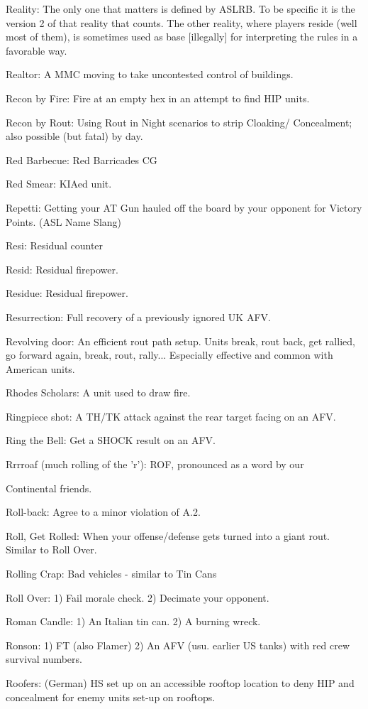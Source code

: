 \documentclass[letterpaper]{article}
\begin{document}
Reality: The only one that matters is defined by ASLRB. To be specific it is the version 2 of that reality that counts. The other reality, where players reside (well most of them), is sometimes used as base [illegally] for interpreting the rules in a favorable way.

Realtor: A MMC moving to take uncontested control of buildings.

Recon by Fire: Fire at an empty hex in an attempt to find HIP units.

Recon by Rout: Using Rout in Night scenarios to strip Cloaking/ Concealment; also possible (but fatal) by day.

Red Barbecue: Red Barricades CG

Red Smear: KIAed unit.

Repetti: Getting your AT Gun hauled off the board by your opponent for Victory Points. (ASL Name Slang)

Resi: Residual counter

Resid: Residual firepower.

Residue: Residual firepower.

Resurrection: Full recovery of a previously ignored UK AFV.

Revolving door: An efficient rout path setup.  Units break, rout back, get rallied, go forward again, break, rout, rally... Especially effective and common with American units.

Rhodes Scholars: A unit used to draw fire.

Ringpiece shot:  A TH/TK attack against the rear target facing on an AFV.

Ring the Bell: Get a SHOCK result on an AFV.

Rrrroaf (much rolling of the 'r'):  ROF, pronounced as a word by our

Continental friends.

Roll-back: Agree to a minor violation of A.2.

Roll, Get Rolled: When your offense/defense gets turned into a giant rout. Similar to Roll Over.

Rolling Crap: Bad vehicles - similar to Tin Cans

Roll Over: 1) Fail morale check. 2) Decimate your opponent.

Roman Candle: 1) An Italian tin can. 2) A burning wreck.

Ronson: 1) FT (also Flamer) 2) An AFV (usu. earlier US tanks) with red crew survival numbers.

Roofers: (German) HS set up on an accessible rooftop location to deny HIP and concealment for enemy units set-up on rooftops.
\end{document}
